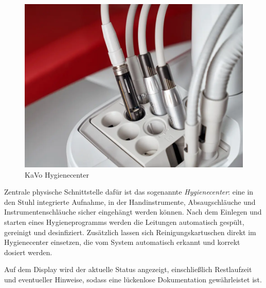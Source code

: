 \vspace{1em}
\begin{figure}[H]
  \centering
  \begin{minipage}[b]{0.7\textwidth}
    \centering
    \includegraphics[width=\textwidth]{images/KaVo-uniQa_Hygienecenter_4000px.png}
  \end{minipage}
  \hspace{0.05\textwidth}
  \caption{KaVo Hygienecenter}
  \label{fig:Hygienecenter}
\end{figure}
\vspace{1em}
\newpage
Zentrale physische Schnittstelle dafür ist das sogenannte \textit{Hygienecenter}: eine in den Stuhl integrierte Aufnahme, in der Handinstrumente, Absaugschläuche und Instrumentenschläuche sicher eingehängt werden können. Nach dem Einlegen und starten eines Hygieneprogramms werden die Leitungen automatisch gespült, gereinigt und desinfiziert. Zusätzlich lassen sich Reinigungskartuschen direkt im Hygienecenter einsetzen, die vom System automatisch erkannt und korrekt dosiert werden.

Auf dem Display wird der aktuelle Status angezeigt, einschließlich Restlaufzeit und eventueller Hinweise, sodass eine lückenlose Dokumentation gewährleistet ist.

